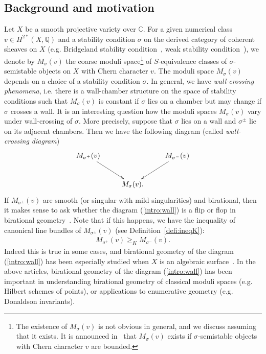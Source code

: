 \documentclass[11pt]{amsart}
\theoremstyle{plain}
\theoremstyle{definition}
\theoremstyle{remark}
\begin{document}
\subsection{Background and motivation}
Let $X$ be a smooth projective variety over $\mathbb{C}$. 
For a given numerical class $v \in H^{2\ast}(X, \mathbb{Q})$
and a stability condition $\sigma$
on the derived category of coherent sheaves on $X$
(e.g. Bridgeland stability condition~\cite{Brs1}, 
weak stability condition~\cite{Tcurve1}), 
we denote by 
$M_{\sigma}(v)$ the coarse moduli space\footnote{The
existence of $M_{\sigma}(v)$ is not obvious in general, and we discuss 
assuming that it exists. It is announced in~\cite{AHLH} that 
$M_{\sigma}(v)$ exists if $\sigma$-semistable objects with 
Chern character $v$ are bounded.} of $S$-equivalence classes of 
$\sigma$-semistable objects on $X$ with Chern character $v$. 
The moduli space $M_{\sigma}(v)$ depends on a choice of a
stability condition
$\sigma$.
In general, 
we have \textit{wall-crossing phenomena}, i.e. 
there is a wall-chamber structure on the space of 
stability conditions such that $M_{\sigma}(v)$
is constant if $\sigma$ lies on a chamber but may change 
if $\sigma$ crosses a wall. 
It is an interesting question how the moduli 
spaces $M_{\sigma}(v)$ vary under wall-crossing of $\sigma$.
More precisely, 
suppose that $\sigma$ lies on a wall
and 
$\sigma^{\pm}$ lie on its adjacent chambers.
Then we 
have the following diagram
(called \textit{wall-crossing diagram})
\begin{align}\label{intro:wall}
\xymatrix{
M_{\sigma^{+}}(v) \ar[rd] & & \ar[ld] M_{\sigma^{-}}(v) \\
&  M_{\sigma}(v).  &
}
\end{align}
If $M_{\sigma^{\pm}}(v)$ are smooth (or singular with mild singularities)
and 
birational, then it makes sense to ask 
whether the diagram (\ref{intro:wall}) is a flip or flop
in birational geometry~\cite{KM}. 
Note that if this happens, 
we have the inequality of canonical 
line bundles of $M_{\sigma^{\pm}}(v)$ (see Definition~\ref{defi:ineqK}):
\begin{align}\label{intro:ineq}
M_{\sigma^{+}}(v) \ge_K M_{\sigma^{-}}(v).
\end{align}
Indeed this is true in some cases, 
and birational geometry of the diagram (\ref{intro:wall}) has 
been especially studied when 
$X$ is an algebraic surface~\cite{MR1355920, MR1362648, MW, MR2729275, 
MR3279532, MR3279532, MR3010070, Todbir}. 
In the above articles, birational geometry 
of the diagram (\ref{intro:wall})
has been 
important in understanding birational geometry
of classical moduli spaces (e.g. Hilbert schemes of points),
or applications to enumerative geometry (e.g. Donaldson invariants). 
\end{document}
